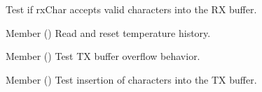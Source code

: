\begin{DoxyRefList}
%
Test if rx\+Char accepts valid characters into the RX buffer.  
\item[Member \doxylink{test_8c_a2bbf7ef789f2d9a19449f0ffb2994c2e}{test\+\_\+temperature\+\_\+ler\+\_\+temps\+\_\+e\+\_\+reset} ()]\label{test__test000013}%
%
Read and reset temperature history.  
\item[Member \doxylink{test_8c_ab27d513a80c676725c0b6be80d6a27de}{test\+\_\+tx\+Char\+\_\+overflow} ()]\label{test__test000007}%
%
Test TX buffer overflow behavior.  
\item[Member \doxylink{test_8c_af6d3a81ea7fe9ab1b8a34a580a14c6a2}{test\+\_\+tx\+Char\+\_\+top} ()]\label{test__test000006}%
%
Test insertion of characters into the TX buffer. 
\end{DoxyRefList}